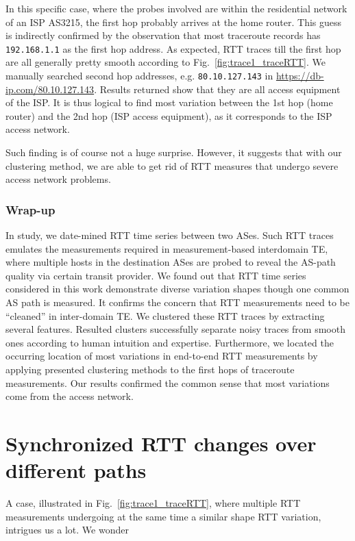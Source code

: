 In this specific case, where the probes involved are within the residential network of an ISP AS3215, the first hop probably arrives at the home router. This guess is indirectly confirmed by the observation that most traceroute records has \texttt{192.168.1.1} as the first hop address. As expected, RTT traces till the first hop are all generally pretty smooth according to Fig.~\ref{fig:trace1_traceRTT}. We manually searched second hop addresses, e.g. \texttt{80.10.127.143} in \url{https://db-ip.com/80.10.127.143}. Results returned show that they are all access equipment of the ISP.
It is thus logical to find most variation between the 1st hop (home router) and the 2nd hop (ISP access equipment), as it corresponds to the ISP access network.  

Such finding is of course not a huge surprise.%
However, it suggests that with our clustering method, we are able to get rid of RTT measures that undergo severe access network problems. 

\subsubsection*{Wrap-up}
In study, we date-mined RTT time series between two ASes. 
Such RTT traces emulates the measurements required in measurement-based interdomain TE, where multiple hosts in the destination ASes are probed to reveal the AS-path quality via certain transit provider.
We found out that RTT time series considered in this work demonstrate diverse variation shapes though one common AS path is measured.
It confirms the concern that RTT measurements need to be ``cleaned'' in inter-domain TE.
We clustered these RTT traces by extracting %
several features. 
Resulted clusters successfully separate noisy traces from smooth ones according to human intuition and expertise.
Furthermore, we located the occurring location of most variations in end-to-end RTT measurements by applying presented clustering methods to the first hops of traceroute measurements.
Our results confirmed the common sense that most variations come from the access network.

\section{Synchronized RTT changes over different paths}
\label{sec:ripe_case_study}

A case, illustrated in Fig.~\ref{fig:trace1_traceRTT}, where multiple RTT measurements undergoing at the same time a similar shape RTT variation, intrigues us a lot. 
We wonder